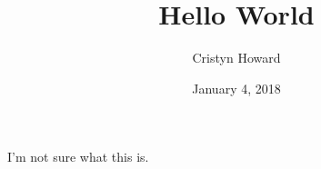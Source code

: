 \documentclass[11pt, oneside]{article}
\title{Hello World}
\author{Cristyn Howard}
\date{January 4, 2018}
\begin{document}
\maketitle
I'm not sure what this is.

\end{document}

